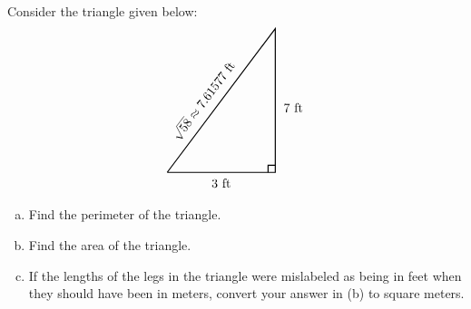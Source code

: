 \documentclass[11pt,letterpaper]{article}
\begin{document}

 Consider the triangle given below:
	\[
	\begin{tikzpicture}
	\draw[line width=0.03cm] (0,0) -- (3,0) -- (3,4) -- (0,0);
	\draw[line width=0.03cm] (2.8,0) -- (2.8,0.2) -- (3,0.2);
	\node at (1.5,-0.3) {$3$~ft};
	\node at (3.5,1.8) {$7$~ft};
	
	\node[rotate=53.1301] at (1,2) {$\sqrt{58} \approx 7.61577 \text{ ft}$};
	\end{tikzpicture}
	\]

\begin{enumerate}[(a)]
\item Find the perimeter of the triangle.
\item Find the area of the triangle. 
\item If the lengths of the legs in the triangle were mislabeled as being in feet when they should have been in meters, convert your answer in (b) to square meters. 
\end{enumerate} 
\end{document}
